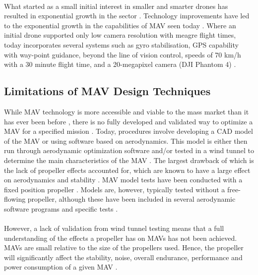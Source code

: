 \\
What started as a small initial interest in smaller and smarter drones has resulted in exponential growth in the sector \cite{NONAMI2007} \cite{Wang2019}. Technology improvements have led to the exponential growth in the capabilities of MAV seen today \cite{Yin2020} \cite{Jackson2016}. Where an initial drone supported only low camera resolution with meagre flight times, today incorporates several systems such as gyro stabilisation, GPS capability with way-point guidance, beyond the line of vision control, speeds of 70 km/h with a 30 minute flight time, and a 20-megapixel camera (DJI Phantom 4) \cite{Peppa2019}. \\





\subsection{Limitations of MAV Design Techniques}
\label{subsec:Limitations}
While MAV technology is more accessible and viable to the mass market than it has ever been before \cite{Jackson2016}, there is no fully developed and validated way to optimize a MAV for a specified mission \cite{Bronz2009} \cite{HASSANALIAN2019}. Today, procedures involve developing a CAD model of the MAV or using software based on aerodynamics. This model is either then run through aerodynamic optimization software and/or tested in a wind tunnel to determine the main characteristics of the MAV \cite{Paulson2017}. The largest drawback of which is the lack of propeller effects accounted for, which are known to have a large effect on aerodynamics and stability \cite{Harikumar2021} \cite{Chinwicharnam2013}. MAV model tests have been conducted with a fixed position propeller \cite{Shams2020b} \cite{Durai2014}. Models are, however, typically tested without a free-flowing propeller, although these have been included in several aerodynamic software programs and specific tests \cite{Aboelezz2020}. \\
\\However, a lack of validation from wind tunnel testing means that a full understanding of the effects a propeller has on MAVs has not been achieved. MAVs are small relative to the size of the propellers used. Hence, the propeller will significantly affect the stability, noise, overall endurance, performance and power consumption of a given MAV \cite{Shams2020} \cite{Chen2022}. 



